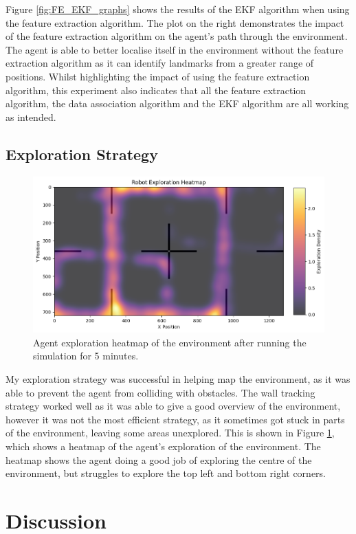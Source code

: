 \documentclass[12pt]{article}
\begin{document}
Figure \ref{fig:FE_EKF_graphs} shows the results of the EKF algorithm when using the feature extraction algorithm. The plot on the right demonstrates
the impact of the feature extraction algorithm on the agent's path through the environment. The agent is able to better localise itself in the environment
without the feature extraction algorithm as it can identify landmarks from a greater range of positions. Whilst highlighting the impact of using the feature
extraction algorithm, this experiment also indicates that all the feature extraction algorithm, the data association algorithm and the EKF algorithm are all
working as intended.\\

\subsection{Exploration Strategy}
\begin{figure}[h]
    \centering
    \includegraphics[width=0.7\linewidth]{heatmap}
    \caption[Short caption]{Agent exploration heatmap of the environment after running the simulation for 5 minutes.}
    \label{fig:heatmap}
\end{figure}
My exploration strategy was successful in helping map the environment, as it was able to prevent the agent from colliding with
obstacles. The wall tracking strategy worked well as it was able to give a good overview of the environment, however it was
not the most efficient strategy, as it sometimes got stuck in parts of the environment, leaving some areas unexplored. This is
shown in Figure \ref{fig:heatmap}, which shows a heatmap of the agent's exploration of the environment. The heatmap shows the
agent doing a good job of exploring the centre of the environment, but struggles to explore the top left and bottom right corners.\\

\section{Discussion}
\end{document}
